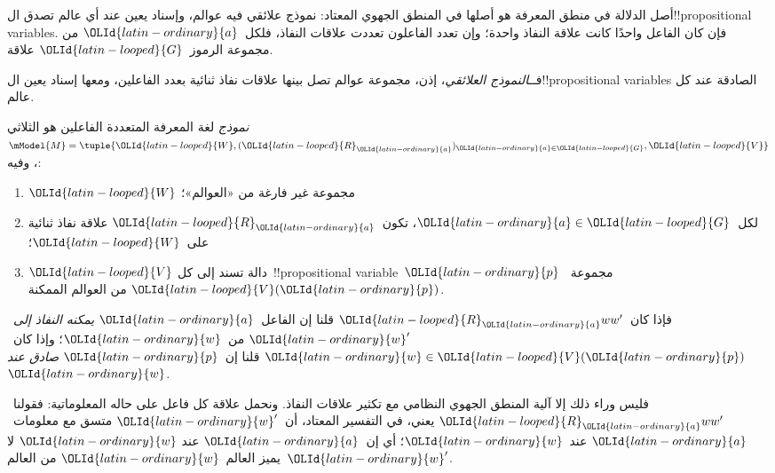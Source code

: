 \documentclass[../../../include/open-logic-section]{subfiles}
\begin{document}


أصل الدلالة في منطق المعرفة هو أصلها في المنطق الجهوي المعتاد: نموذج
علائقي فيه عوالم، وإسناد يعين عند أي عالم تصدق ال!!{propositional variable}s.
فإن كان الفاعل واحدًا كانت علاقة النفاذ واحدة؛ وإن تعدد الفاعلون تعددت
علاقات النفاذ، فلكل~${\OLId{latin-ordinary}{a}}$ من مجموعة الرموز~${\OLId{latin-looped}{G}}$ علاقة.

فــ\emph{النموذج العلائقي}، إذن، مجموعة عوالم تصل بينها علاقات نفاذ
ثنائية بعدد الفاعلين، ومعها إسناد يعين ال!!{propositional variable}s
الصادقة عند كل عالم.

\begin{defn}
  \emph{نموذج} لغة المعرفة المتعددة الفاعلين هو الثلاثي
  $\mModel{M}=\tuple{{\OLId{latin-looped}{W}},({\OLId{latin-looped}{R}}_{\OLId{latin-ordinary}{a}})_{{\OLId{latin-ordinary}{a}} \in {\OLId{latin-looped}{G}}},{\OLId{latin-looped}{V}}}$، وفيه:
  \begin{enumerate}
  \item ${\OLId{latin-looped}{W}}$ مجموعة غير فارغة من «العوالم»؛
  \item لكل~${\OLId{latin-ordinary}{a}} \in {\OLId{latin-looped}{G}}$، تكون~${{\OLId{latin-looped}{R}}}_{\OLId{latin-ordinary}{a}}$ علاقة نفاذ ثنائية على~${\OLId{latin-looped}{W}}$؛
  \item ${\OLId{latin-looped}{V}}$ دالة تسند إلى كل~!!{propositional
    variable}~${\OLId{latin-ordinary}{p}}$ مجموعة~${\OLId{latin-looped}{V}}({\OLId{latin-ordinary}{p}})$ من العوالم الممكنة.
  \end{enumerate}
  فإذا كان~${\OLId{latin-looped}{R}}_{\OLId{latin-ordinary}{a}} ww'$ قلنا إن الفاعل~${\OLId{latin-ordinary}{a}}$ \emph{يمكنه النفاذ إلى}~${\OLId{latin-ordinary}{w}}'$
  من~${\OLId{latin-ordinary}{w}}$؛ وإذا كان~${\OLId{latin-ordinary}{w}} \in {\OLId{latin-looped}{V}}({\OLId{latin-ordinary}{p}})$ قلنا إن~${\OLId{latin-ordinary}{p}}$ \emph{صادق عند}~${\OLId{latin-ordinary}{w}}$.
\end{defn}

فليس وراء ذلك إلا آلية المنطق الجهوي النظامي مع تكثير علاقات النفاذ.
ونحمل علاقة كل فاعل على حاله المعلوماتية: فقولنا~${\OLId{latin-looped}{R}}_{\OLId{latin-ordinary}{a}} ww'$ يعني، في
التفسير المعتاد، أن~${\OLId{latin-ordinary}{w}}'$ متسق مع معلومات~${\OLId{latin-ordinary}{a}}$ عند~${\OLId{latin-ordinary}{w}}$؛ أي إن~${\OLId{latin-ordinary}{a}}$ عند
${\OLId{latin-ordinary}{w}}$ لا يميز العالم~${\OLId{latin-ordinary}{w}}$ من العالم~${\OLId{latin-ordinary}{w}}'$.
\end{document}
